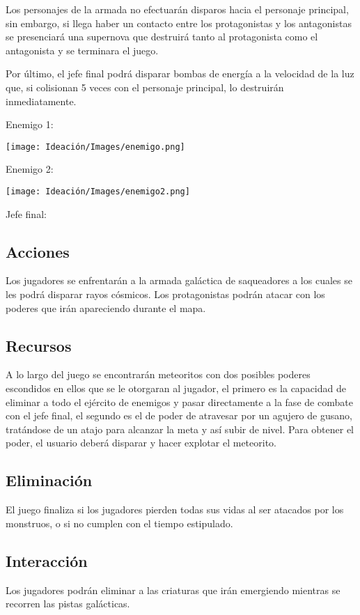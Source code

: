 \documentclass{article}
\begin{document}
Los personajes de la armada no efectuarán disparos hacia el personaje principal, sin embargo, si llega haber un contacto entre los protagonistas y los antagonistas se presenciará una supernova que destruirá tanto al protagonista como el antagonista y se terminara el juego. 

Por último, el jefe final podrá disparar bombas de energía a la velocidad de la luz que, si colisionan 5 veces con el personaje principal, lo destruirán inmediatamente. 

Enemigo 1: 


\texttt{[image: Ideación/Images/enemigo.png]}

Enemigo 2:

\texttt{[image: Ideación/Images/enemigo2.png]}

Jefe final: 



\subsection{Acciones}
Los jugadores se enfrentarán a la armada galáctica de saqueadores a los cuales se les podrá disparar rayos cósmicos. 
Los protagonistas podrán atacar con los poderes que irán apareciendo durante el mapa.

\subsection{Recursos}
A lo largo del juego se encontrarán meteoritos con dos posibles poderes escondidos en ellos que se le otorgaran al jugador, el primero es la capacidad de eliminar a todo el ejército de enemigos y pasar directamente a la fase de combate con el jefe final, el segundo es el de poder de atravesar por un agujero de gusano, tratándose de un atajo para alcanzar la meta y así subir de nivel. 
Para obtener el poder, el usuario deberá disparar y hacer explotar el meteorito.

\subsection{Eliminación}
El juego finaliza si los jugadores pierden todas sus vidas al ser atacados por los monstruos, o si no cumplen con el tiempo estipulado.

\subsection{Interacción}
Los jugadores podrán eliminar a las criaturas que irán emergiendo mientras se recorren las pistas galácticas.
\end{document}
